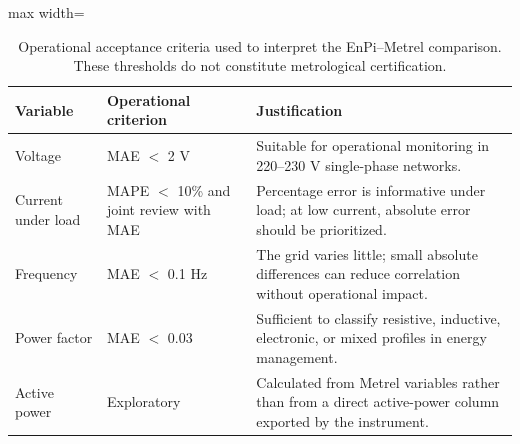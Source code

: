 \documentclass{ieeeaccess}
\begin{document}
\begin{table}[H]
\caption{Operational acceptance criteria used to interpret the EnPi--Metrel comparison. These thresholds do not constitute metrological certification.}
\label{tab:criterios-operacionales}
\centering
\scriptsize
\begin{adjustbox}{max width=\columnwidth}
\begin{tabular}{p{}p{}p{}}
\toprule
Variable & Operational criterion & Justification \\
\midrule
Voltage & MAE $<$ 2 V & Suitable for operational monitoring in 220--230 V single-phase networks. \\
Current under load & MAPE $<$ 10\% and joint review with MAE & Percentage error is informative under load; at low current, absolute error should be prioritized. \\
Frequency & MAE $<$ 0.1 Hz & The grid varies little; small absolute differences can reduce correlation without operational impact. \\
Power factor & MAE $<$ 0.03 & Sufficient to classify resistive, inductive, electronic, or mixed profiles in energy management. \\
Active power & Exploratory & Calculated from Metrel variables rather than from a direct active-power column exported by the instrument. \\
\bottomrule
\end{tabular}
\end{adjustbox}
\end{table}
\end{document}

